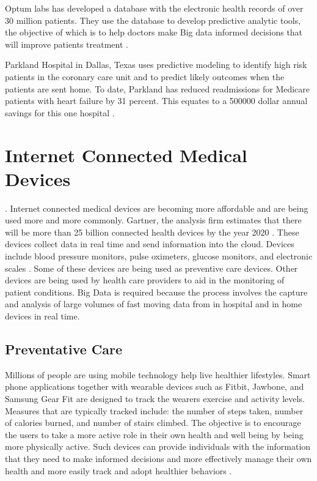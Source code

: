 \documentclass[sigconf]{acmart}
\begin{document}
Optum labs has developed a database with the electronic health records of over 30 million patients. They use the database to develop predictive analytic tools, the objective of which is to help doctors make Big data informed decisions that will improve patients treatment \cite{www-google-McDonald}.  

Parkland Hospital in Dallas, Texas uses predictive modeling to identify high risk patients in the coronary care unit and to predict likely outcomes when the patients are sent home. To date, Parkland has reduced readmissions for Medicare patients with heart failure by 31 percent. This equates to a 500000 dollar annual savings for this one hospital \cite{www-google-data}. 

\section{Internet Connected Medical Devices}. 
Internet connected medical devices are becoming more affordable and are being used more and more commonly.  Gartner, the analysis firm estimates that there will be more than 25 billion connected health devices by the year 2020 \cite{www-google-HlthCat}. These devices collect data in real time and send information into the cloud. Devices include blood pressure monitors, pulse oximeters, glucose monitors, and electronic scales \cite{www-google-HlthCat}.  Some of these devices are being used as preventive care devices. Other devices are being used by health care providers to aid in the monitoring of patient conditions.  Big Data is required because the process involves the capture and analysis of large volumes of fast moving data from in hospital and in home devices in real time.

\subsection{Preventative Care}
Millions of people are using mobile technology help live healthier lifestyles. Smart phone applications together with wearable devices such as Fitbit, Jawbone, and Samsung Gear Fit are designed to track the wearers exercise and activity levels. Measures that are typically tracked include: the number of steps taken, number of calories burned, and number of stairs climbed. The objective is to encourage the users to take a more active role in their own health and well being by being more physically active. Such devices can provide individuals with the information that they need to make informed decisions and more effectively manage their own health and more easily track and adopt healthier behaviors \cite{milbank}. 
\end{document}
